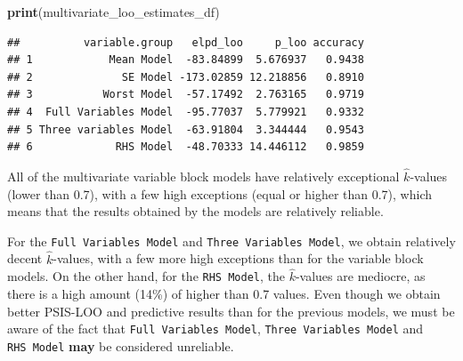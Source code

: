 \documentclass[
]{article}
\newenvironment{Shaded}{\begin{snugshade}}{\end{snugshade}}
\newcommand{\KeywordTok}[1]{\textcolor[rgb]{0.13,0.29,0.53}{\textbf{#1}}}
\newcommand{\NormalTok}[1]{#1}
\begin{document}
\begin{Shaded}
\begin{Highlighting}[]
\KeywordTok{print}\NormalTok{(multivariate_loo_estimates_df)}
\end{Highlighting}
\end{Shaded}

\begin{verbatim}
##          variable.group   elpd_loo     p_loo accuracy
## 1            Mean Model  -83.84899  5.676937   0.9438
## 2              SE Model -173.02859 12.218856   0.8910
## 3           Worst Model  -57.17492  2.763165   0.9719
## 4  Full Variables Model  -95.77037  5.779921   0.9332
## 5 Three variables Model  -63.91804  3.344444   0.9543
## 6             RHS Model  -48.70333 14.446112   0.9859
\end{verbatim}

All of the multivariate variable block models have relatively
exceptional \(\hat{k}\)-values (lower than 0.7), with a few high
exceptions (equal or higher than 0.7), which means that the results
obtained by the models are relatively reliable.

For the \texttt{Full\ Variables\ Model} and
\texttt{Three\ Variables\ Model}, we obtain relatively decent
\(\hat{k}\)-values, with a few more high exceptions than for the
variable block models. On the other hand, for the \texttt{RHS\ Model},
the \(\hat{k}\)-values are mediocre, as there is a high amount (14\%) of
higher than 0.7 values. Even though we obtain better PSIS-LOO and
predictive results than for the previous models, we must be aware of the
fact that \texttt{Full\ Variables\ Model},
\texttt{Three\ Variables\ Model} and \texttt{RHS\ Model} \textbf{may} be
considered unreliable.
\end{document}
